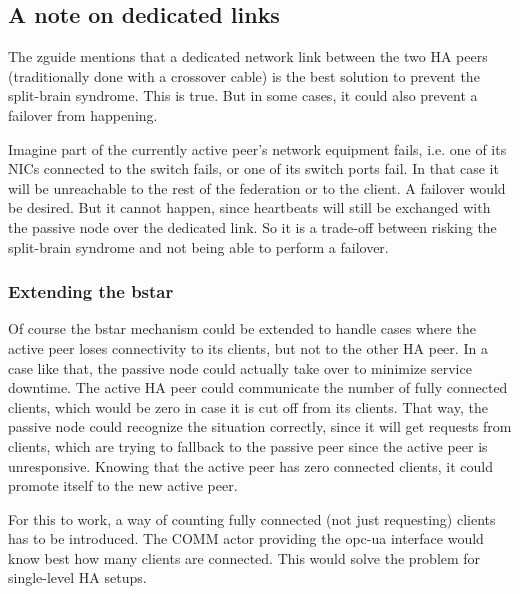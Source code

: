 \subsection{A note on dedicated links}
The \gls{zguide} mentions that a dedicated network link between the two HA peers
(traditionally done with a crossover cable) is the best solution to prevent the
split-brain syndrome. This is true. But in some cases, it could also prevent a
failover from happening.

Imagine part of the currently active peer's network equipment fails, i.e. one
of its \glspl{NIC} connected to the switch fails, or one of its switch ports
fail. In that case it will be unreachable to the rest of the
federation or to the client. A failover would be desired. But it
cannot happen, since heartbeats will still be exchanged with the passive node over
the dedicated link. So it is a trade-off between risking the split-brain
syndrome and not being able to perform a failover.

\subsubsection{Extending the \gls{bstar}}\label{sec:approach:ha:bstar-ext}
Of course the \gls{bstar} mechanism could be extended to handle cases where the
active peer loses connectivity to its clients, but not to the other HA peer. In
a case like that, the passive node could actually take over to minimize
service downtime. The active HA peer could communicate the number of fully connected clients,
which would be zero in case it is cut off from its clients. That way, the
passive node could recognize the situation correctly, since it will get
requests from clients, which are trying to fallback to the passive peer since
the active peer is unresponsive. Knowing that the active peer has zero
connected clients, it could promote itself to the new active peer.

For this to work, a way of counting fully connected (not just requesting)
clients has to be introduced. The COMM actor providing the \gls{opc-ua}
interface would know best how many clients are connected. This would solve the problem for single-level HA setups.

